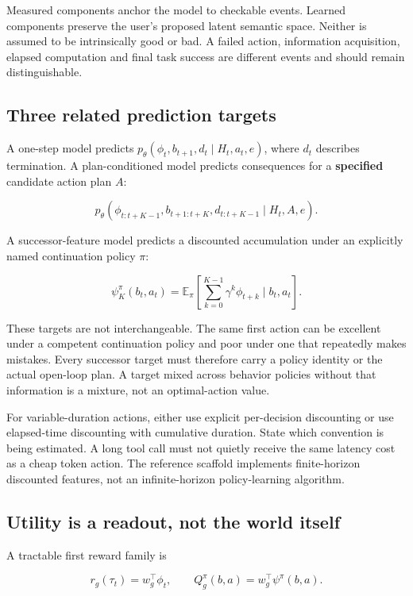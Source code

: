 \documentclass[
  11pt,
  a4paper,
]{article}
\begin{document}
Measured components anchor the model to checkable events. Learned
components preserve the user's proposed latent semantic space. Neither
is assumed to be intrinsically good or bad. A failed action, information
acquisition, elapsed computation and final task success are different
events and should remain distinguishable.

\subsection{Three related prediction
targets}\label{three-related-prediction-targets}

A one-step model predicts
\(p_\theta(\phi_t,b_{t+1},d_t\mid H_t,a_t,e)\), where \(d_t\) describes
termination. A plan-conditioned model predicts consequences for a
\textbf{specified} candidate action plan \(A\):

\[
p_\theta(\phi_{t:t+K-1},b_{t+1:t+K},d_{t:t+K-1}\mid H_t,A,e).
\]

A successor-feature model predicts a discounted accumulation under an
explicitly named continuation policy \(\pi\):

\[
\psi_K^\pi(b_t,a_t)=\mathbb{E}_{\pi}\left[\sum_{k=0}^{K-1}\gamma^k\phi_{t+k}\mid b_t,a_t\right].
\]

These targets are not interchangeable. The same first action can be
excellent under a competent continuation policy and poor under one that
repeatedly makes mistakes. Every successor target must therefore carry a
policy identity or the actual open-loop plan. A target mixed across
behavior policies without that information is a mixture, not an
optimal-action value.

For variable-duration actions, either use explicit per-decision
discounting or use elapsed-time discounting with cumulative duration.
State which convention is being estimated. A long tool call must not
quietly receive the same latency cost as a cheap token action. The
reference scaffold implements finite-horizon discounted features, not an
infinite-horizon policy-learning algorithm.

\subsection{Utility is a readout, not the world
itself}\label{utility-is-a-readout-not-the-world-itself}

A tractable first reward family is

\[
r_g(\tau_t)=w_g^\top\phi_t,\qquad Q_g^\pi(b,a)=w_g^\top\psi^\pi(b,a).
\]
\end{document}
